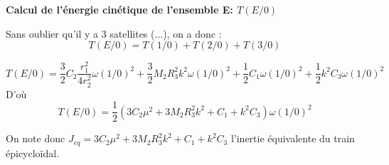 \documentclass[10pt,fleqn]{article} %
\begin{document}
\begin{corrige}

\textbf{Calcul de l'énergie cinétique de l'ensemble E: $T(E/0)$}

Sans oublier qu'il y a 3 satellites (...), on a donc :
$$T(E/0)=T(1/0)+T(2/0)+T(3/0) $$

$$T(E/0) = \dfrac{3}{2} C_2 \dfrac{r_1^2}{4r_2^2}\omega(1/0)^2 + \dfrac{3}{2}M_2 R_3^2 k^2 \omega(1/0)^2 + \dfrac{1}{2} C_1 \omega(1/0)^2 + \dfrac{1}{2} k^2 C_3 \omega(1/0)^2
$$
D'où 
$$T(E/0) = \dfrac{1}{2}\left( 3 C_2 \mu^2 + 3M_2 R_3^2 k^2 + C_1  +  k^2 C_3 \right)\omega(1/0)^2
$$

On note donc $J_{eq} = 3 C_2 \mu^2 + 3M_2 R_3^2 k^2 + C_1  +  k^2 C_3$ l'inertie équivalente du train épicycloïdal.
\end{corrige}

\begin{corrige}
\begin{methode}
\end{methode}
\end{corrige}
\end{document}
